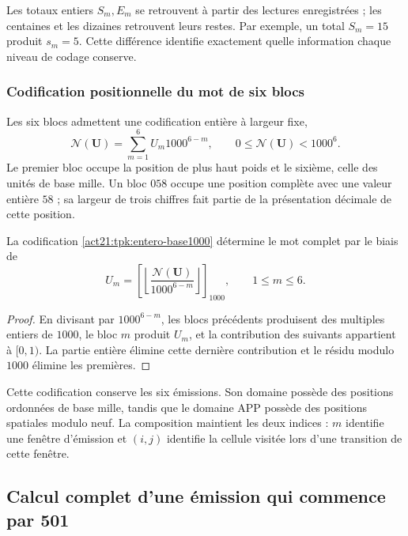 Les totaux entiers \(S_m,E_m\) se retrouvent à partir des lectures enregistrées ;
les centaines et les dizaines retrouvent leurs restes. Par exemple, un total
\(S_m=15\) produit \(s_m=5\). Cette différence identifie exactement
quelle information chaque niveau de codage conserve.

\subsubsection{Codification positionnelle du mot de six blocs}

Les six blocs admettent une codification entière à largeur fixe,
\begin{equation}
 \mathscr N(\mathbf U)=\sum_{m=1}^{6}U_m1000^{6-m},
 \qquad0\leq\mathscr N(\mathbf U)<1000^6.
 \label{act21:tpk:entero-base1000}
\end{equation}
Le premier bloc occupe la position de plus haut poids et le sixième, celle des unités de base mille. Un bloc \(058\) occupe une position complète avec une valeur entière \(58\) ; sa largeur de trois chiffres fait partie de la présentation décimale de cette position.

\begin{proposition}
\label{act21:tpk:inversa-base1000}
La codification \eqref{act21:tpk:entero-base1000} détermine le mot complet
par le biais de
\[
 U_m=\left[\left\lfloor
 \frac{\mathscr N(\mathbf U)}{1000^{6-m}}\right\rfloor\right]_{1000},
 \qquad1\leq m\leq6.
\]
\end{proposition}
\begin{proof}
En divisant par \(1000^{6-m}\), les blocs précédents produisent des multiples entiers de \(1000\), le bloc \(m\) produit \(U_m\), et la contribution des suivants appartient à \([0,1)\). La partie entière élimine cette dernière contribution et le résidu modulo \(1000\) élimine les premières.
\end{proof}

Cette codification conserve les six émissions. Son domaine possède des positions ordonnées de base mille, tandis que le domaine APP possède des positions spatiales modulo neuf. La composition maintient les deux indices : \(m\) identifie une fenêtre d'émission et \((i,j)\) identifie la cellule visitée lors d'une transition de cette fenêtre.

\subsection{Calcul complet d'une émission qui commence par 501}
\label{act21:tpk:ejemplo501}

